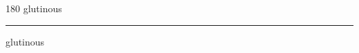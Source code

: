 
\begin{frame}
\begin{center}
\begin{turn}{180}
{\fontsize{2.5cm}{1em}\selectfont glutinous}
\end{turn}
\vspace{1em}\par  
\hrule
\vspace{1em}\par  
{\fontsize{2.5cm}{1em}\selectfont glutinous}
\end{center}
\end{frame}
